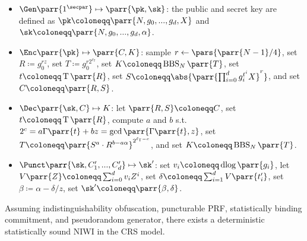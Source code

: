 
\begin{itemize}
    \item \(\Gen\parr{1^\secpar} \mapsto \parr{\pk,\sk}\):
    the public and secret key are defined as \(\pk \coloneqq \parr{N, g_0, ..., g_d, X}\) and \(\sk \coloneqq \parr{N, g_0, ..., g_d, \alpha}\).
    
    \item \(\Enc\parr{\pk} \mapsto \parr{C,K}\):
    sample \(r \gets \pars{\parr{N-1}/4}\),
    set \(R \coloneqq g_0^{r z}\),
    set \(T \coloneqq g_0^{r 2^{\ell_{\mathsf{T}}}}\),
    set \(K \coloneqq \operatorname{BBS}_N\parr{T}\),
    set \(t \coloneqq \operatorname{T}\parr{R}\),
    set \(S \coloneqq \abs{\parr{\prod_{i=0}^d g_i^{t^i} X}^r}\),
    and set \(C \coloneqq \parr{R,S}\).

    \item \(\Dec\parr{\sk,C} \mapsto K\):
    let \(\parr{R,S} \coloneqq C\),
    set \(t \coloneqq \operatorname{T}\parr{R}\),
    compute \(a\) and \(b\) s.t.\ \(2^c = a \Gamma\parr{t} + b z = \gcd\parr{\Gamma\parr{t}, z}\),
    set \(T \coloneqq \parr{S^a \cdot R^{b - a \alpha}}^{2^{\ell_{\mathsf{T}}-c}}\),
    and set \(K \coloneqq \operatorname{BBS}_N\parr{T}\).

    \item \(\Punct\parr{\sk,C'_1,...,C'_d} \mapsto \sk'\):
    set \(v_i \coloneqq \operatorname{dlog}\parr{g_i}\),
    let \(V\parr{Z} \coloneqq \sum_{i=0}^d v_i Z^i\),
    set \(\delta \coloneqq \sum_{i=1}^d V\parr{t'_i}\),
    set \(\beta \coloneqq \alpha - \delta/z\),
    set \(\sk' \coloneqq \parr{\beta, \delta}\).
\end{itemize}


\begin{theorem}
    Assuming indistinguishability obfuscation,
    puncturable PRF,
    statistically binding commitment,
    and pseudorandom generator,
    there exists a deterministic statistically sound NIWI in the CRS model.
\end{theorem}

